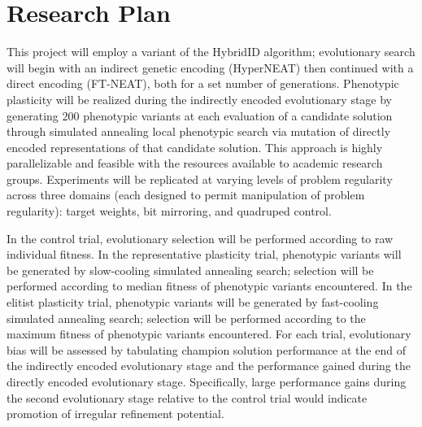 \renewcommand{\thefootnote}{\fnsymbol{footnote}}
\section{Research Plan}
This project will employ a variant of the HybridID \autocite{Clune2011OnRegularity} algorithm;
evolutionary search will begin with an indirect genetic encoding (HyperNEAT) then continued with a direct encoding (FT-NEAT), both for a set number of generations.
Phenotypic plasticity will be realized during the indirectly encoded evolutionary stage by generating 200 phenotypic variants at each evaluation of a candidate solution through simulated annealing local phenotypic search via mutation of directly encoded representations of that candidate solution.
This approach is highly parallelizable and feasible with the resources available to academic research groups.\autocite{Mengistu2016EvolvabilityIt}
Experiments will be replicated at varying levels of problem regularity across three domains (each designed to permit manipulation of problem regularity): target weights, bit mirroring, and quadruped control.\autocite{Clune2011OnRegularity}

In the control trial, evolutionary selection will be performed according to raw individual fitness.
In the representative plasticity trial, phenotypic variants will be generated by slow-cooling simulated annealing search;
selection will be performed according to median fitness of phenotypic variants encountered.
In the elitist plasticity trial, phenotypic variants will be generated by fast-cooling simulated annealing search;
selection will be performed according to the maximum fitness of phenotypic variants encountered.
For each trial, evolutionary bias will be assessed by tabulating champion solution performance at the end of the indirectly encoded evolutionary stage and the performance gained during the directly encoded evolutionary stage.
Specifically, large performance gains during the second evolutionary stage relative to the control trial would indicate promotion of irregular refinement potential.
